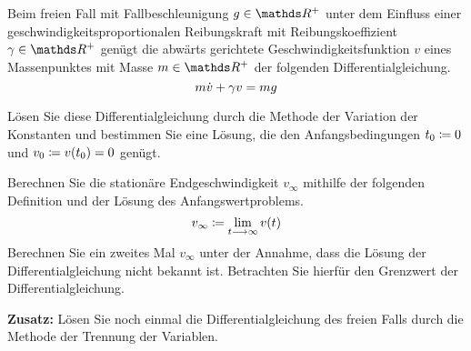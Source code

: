 \begin{atiTask}[
  title = Freier Fall mit Reibung
]
 Beim freien Fall mit Fallbeschleunigung $g\in\setReal^+$ unter dem Einfluss einer geschwindigkeitsproportionalen Reibungskraft mit Reibungskoeffizient $\gamma\in\setReal^+$ genügt die abwärts gerichtete Geschwindigkeitsfunktion $v$ eines Massenpunktes mit Masse $m\in\setReal^+$ der folgenden Differentialgleichung.
 \[
   m\dot{v} + \gamma v = mg
 \]
 \begin{atiSubtasks}
   \item{
    Lösen Sie diese Differentialgleichung durch die Methode der Variation der Konstanten und bestimmen Sie eine Lösung, die den Anfangsbedingungen $t_0\coloneqq 0$ und $v_0\coloneqq v(t_0)=0$ genügt.
  }
  \item{
    Berechnen Sie die stationäre Endgeschwindigkeit $v_\infty$ mithilfe der folgenden Definition und der Lösung des Anfangswertproblems.
    \[
      v_\infty \define \lim_{t\converges\infty}v(t)
    \]
    Berechnen Sie ein zweites Mal $v_\infty$ unter der Annahme, dass die Lösung der Differentialgleichung nicht bekannt ist.
    Betrachten Sie hierfür den Grenzwert der Differentialgleichung.
  }
  \item{
    \textbf{Zusatz:}
    Lösen Sie noch einmal die Differentialgleichung des freien Falls durch die Methode der Trennung der Variablen.
  }
 \end{atiSubtasks}
\end{atiTask}
